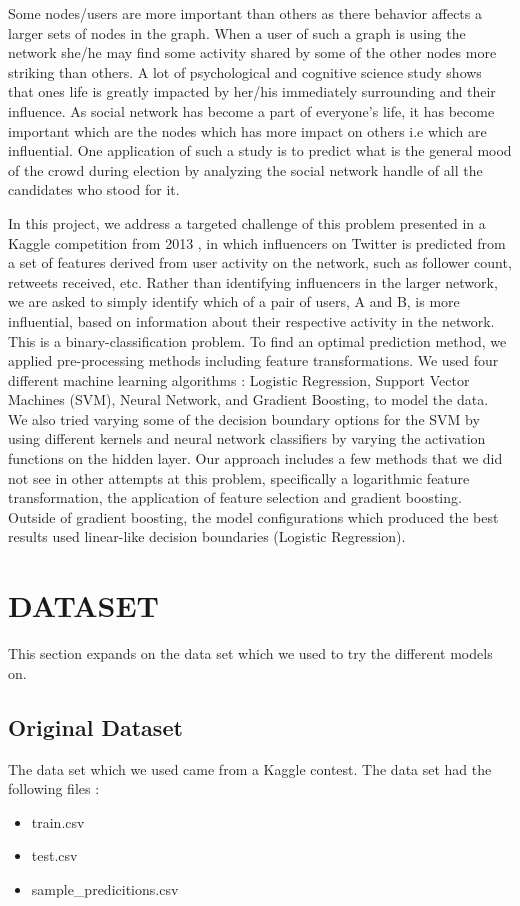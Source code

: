 \documentclass[conference]{IEEEtran}
\numberwithin{equation}{section}
\numberwithin{figure}{section}
\numberwithin{table}{section}
\begin{document}
Some nodes/users are more important than others as there behavior affects a larger sets of nodes in the graph. When a user of such a graph is using the network she/he may find some activity shared by some of the other nodes more striking than others. A lot of psychological and cognitive science study shows that ones life is greatly impacted by her/his immediately surrounding and their influence. As social network has become a part of everyone's life, it has become important which are the nodes which has more impact on others i.e which are influential. One application of such a study is to predict what is the general mood of the crowd during election by analyzing the social network handle of all the candidates who stood for it. 

In this project, we address a targeted challenge of this problem presented in a Kaggle\cite{kaggle} competition from 2013 , in which influencers on Twitter is predicted from a set of features derived from user activity on the network, such as follower count, retweets received, etc. Rather than identifying influencers in the larger network, we are asked to simply identify which of a pair of users, A and B, is more influential, based on information about their respective activity in the network. This is a binary-classification problem. To find an optimal prediction method, we applied pre-processing methods including feature transformations. We used four different machine learning algorithms : Logistic Regression, Support Vector Machines (SVM), Neural Network, and Gradient Boosting, to model the data. We also tried varying some of the decision boundary options for the SVM by using different kernels and neural network classifiers by varying the activation functions on the hidden layer. Our approach includes a few methods that we did not see in other attempts at this problem, specifically a logarithmic feature transformation, the application of feature selection and gradient boosting. Outside of gradient boosting, the model configurations which produced the best results used linear-like decision boundaries (Logistic Regression).
 
\section{DATASET}\label{sec:page-layout}

This section expands on the data set which we used to try the different models on. 

\subsection{Original Dataset}\label{sec:formatting}
The data set which we used came from a Kaggle contest. The data set had the following files : 
\begin{itemize}
  \item train.csv
  \item test.csv
  \item sample\_predicitions.csv
\end{itemize}
\end{document}
